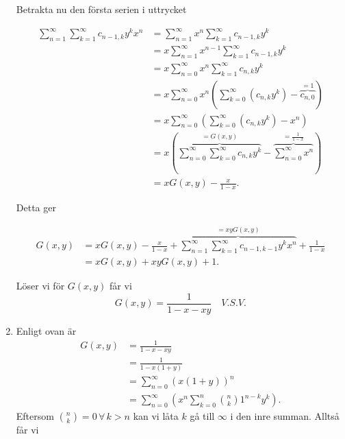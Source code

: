 \documentclass{article}
\begin{document}
\begin{enumerate}[label=(\roman*)]
		Betrakta nu den första serien i uttrycket
		
		\begin{equation*}
			\begin{aligned}
				\sum\limits_{n=1}^\infty \sum\limits_{k=1}^\infty c_{n-1,k} y^{k} x^{n} &= \sum\limits_{n=1}^\infty x^{n} \sum\limits_{k=1}^\infty c_{n-1,k} y^{k} \\
													&= x \sum\limits_{n=1}^\infty x^{n-1} \sum\limits_{k=1}^\infty c_{n-1,k} y^{k} \\
													&= x \sum\limits_{n=0}^\infty x^{n} \sum\limits_{k=1}^\infty c_{n,k} y^{k} \\
													&= x \sum\limits_{n=0}^\infty x^{n} \left( \sum\limits_{k=0}^\infty \left( c_{n,k} y^{k} \right) - \overbrace{c_{n,0}}^\text{$=1$} \right) \\
													&= x \sum\limits_{n=0}^\infty \left( \sum\limits_{k=0}^\infty \left( c_{n,k} y^{k} \right) - x^{n} \right) \\
													&= x \left( \overbrace{\sum\limits_{n=0}^\infty \sum\limits_{k=0}^\infty c_{n,k} y^{k}}^\text{$= G(x,y)$} - \overbrace{\sum\limits_{n=0}^\infty x^{n}}^\text{$= \frac{1}{1-x}$} \right)\\
													&= xG(x,y) - \frac{x}{1-x}.
			\end{aligned}
		\end{equation*}

		Detta ger

		\begin{equation*}
			\begin{aligned}
				G(x,y) &= xG(x,y) - \frac{x}{1-x} + \overbrace{\sum\limits_{n=1}^\infty \sum\limits_{k=1}^{\infty} c_{n-1, k-1} y^{k} x^{n}}^\text{$=xyG(x,y)$} + \frac{1}{1 - x}\\
				       &= xG(x,y) + xyG(x,y) + 1.
			\end{aligned}
		\end{equation*}

		Löser vi för $G(x,y)$ får vi
		\begin{equation*}
			G(x,y) = \frac{1}{1 - x - xy} \quad V.S.V.
		\end{equation*}

	\item
		Enligt ovan är
		\begin{equation*}
			\begin{aligned}
				G(x,y) &= \frac{1}{1-x-xy}\\
				       &= \frac{1}{1-x(1+y)}\\
				       &= \sum\limits_{n=0}^{\infty} \left( x(1+y) \right)^{n}\\
				       &= \sum\limits_{n=0}^{\infty} \left( x^{n} \sum\limits_{k=0}^{n} {n \choose k} 1^{n - k} y^{k} \right).
			\end{aligned}
		\end{equation*}
		Eftersom ${n \choose k} = 0 \, \forall \, k > n$ kan vi låta $k$ gå till $\infty$ i den inre summan. Alltså får vi
		

\end{enumerate}
\end{document}
